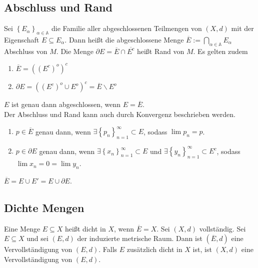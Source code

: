 \documentclass[a4paper,12pt]{article}
\begin{document}
\subsection{Abschluss und Rand}
Sei $\left\{E_\alpha \right\}_{\alpha  \in \mathbb{A}}$ die Familie aller abgeschlossenen Teilmengen von $(X,d)$ mit der Eigenschaft $E\subseteq E_\alpha $. Dann heißt die abgeschlossene Menge $\overline{E}:=\bigcap_{\alpha  \in \mathbb{A}}E_\alpha $ Abschluss von $M$. Die Menge $\partial E=\overline{E}\cap \overline{E^c}$ heißt Rand von $M$. Es gelten zudem
\begin{enumerate}[label=\arabic*.]
        \item $\overline{E}=( (E^c)^o)^c$ 
        \item $\partial E=( (E^c)^o\cup E^o)^c=\overline{E}\backslash E^o$ 
\end{enumerate}
$E$ ist genau dann abgeschlossen, wenn $E=\overline{E}$.\\\noindent
Der Abschluss und Rand kann auch durch Konvergenz beschrieben werden.
\begin{enumerate}[label=\arabic*.]
        \item $p \in \overline{E}$ genau dann, wenn $\exists \left\{p_n\right\}^\infty_{n=1}\subset E$, sodass $\lim p_n=p$.
        \item $p \in \partial E$ genau dann, wenn $\exists \left\{x_n\right\}^\infty_{n=1}\subset E$ und $\exists \left\{y_n\right\}_{n=1}^\infty\subset E^c$, sodass $\lim x_n=0=\lim y_n$.
\end{enumerate}
$\overline{E}=E\cup E'=E\cup \partial E$.

\subsection{Dichte Mengen}
Eine Menge $E\subseteq X$ heißt dicht in $X$, wenn $\overline{E}=X$. Sei $(X,d)$ vollständig. Sei $E\subseteq X$ und sei $(E,d)$ der induzierte metrische Raum. Dann ist $(\overline{E},d)$ eine Vervollständigung von $(E,d)$. Falls $E$ zusätzlich dicht in $X$ ist, ist $(X,d)$ eine Vervollständigung von $(E,d)$. 
\end{document}
